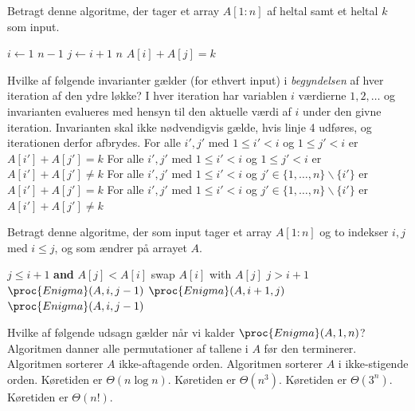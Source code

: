 Betragt denne algoritme, der tager et array $A[1:n]$ af heltal samt et heltal $k$ som input.
\begin{codebox}
\li \For $i \gets 1$ \To $n-1$
\li \Do
        \For $j \gets i+1$ \To $n$
\li     \Do
            \If $A[i] + A[j] = k$
\li         \Then \Return {}
         \End
        \End
    \End
\li \Return {}
\end{codebox}
Hvilke af følgende invarianter gælder (for ethvert input) i \emph{begyndelsen} af hver iteration af den ydre løkke? 
I hver iteration har variablen $i$ værdierne $1, 2, \dots$ og invarianten evalueres med hensyn til den aktuelle værdi af $i$ under den givne iteration.
Invarianten skal ikke nødvendigvis gælde, hvis linje 4 udføres, og iterationen derfor afbrydes.
\fleresvar
\mulighederstart
\svar For alle $i',j'$ med $1\leq i' < i$ og $1\leq j'<i$ er $A[i']+A[j'] = k$
\svar For alle $i',j'$ med $1\leq i' < i$ og $1\leq j'<i$ er $A[i']+A[j'] \ne k$
\svar For alle $i',j'$ med $1\leq i' < i$ og $j'\in\{1,\dots,n\}\backslash\{i'\}$ er $A[i']+A[j'] = k$
\svar For alle $i',j'$ med $1\leq i' < i$ og $j'\in\{1,\dots,n\}\backslash\{i'\}$ er $A[i']+A[j'] \ne k$ \korrekt
\mulighederslut
{}

Betragt denne algoritme, der som input tager et array $A[1:n]$ og to indekser $i,j$ med $i\leq j$, og som ændrer på arrayet $A$.
\begin{codebox}
  \li \If $j\leq i+1$ \textbf{ and } $A[j]<A[i]$ \Do
  \li swap $A[i]$ with $A[j]$  \li \ElseIf $j>i+1$ \Do
  \li $\proc{Enigma}(A,i,j-1)$
  \li $\proc{Enigma}(A,i+1,j)$
  \li $\proc{Enigma}(A,i,j-1)$
  \End
\end{codebox}
Hvilke af følgende udsagn gælder når vi kalder $\proc{Enigma}(A, 1, n)$?
\fleresvar
\mulighederstart
\svar Algoritmen danner alle permutationer af tallene i $A$ før den terminerer.
\svar Algoritmen sorterer $A$ ikke-aftagende orden.\korrekt
\svar Algoritmen sorterer $A$ i ikke-stigende orden.
\svar Køretiden er $\Theta(n \log n)$.
\svar Køretiden er $\Theta(n^3)$.
\svar Køretiden er $\Theta(3^n)$.\korrekt
\svar Køretiden er $\Theta(n!)$.
\mulighederslut
{}

